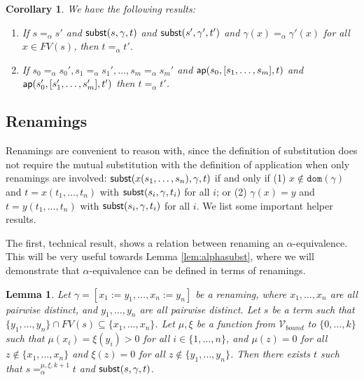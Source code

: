 \documentclass{lmcs}
\theoremstyle{theorem}\newtheorem{theorem}[dummy]{Theorem}
\theoremstyle{theorem}\newtheorem{lemma}[dummy]{Lemma}
\theoremstyle{theorem}\newtheorem{corollary}[dummy]{Corollary}
\theoremstyle{definition}\newtheorem{definition}[dummy]{Definition}
\theoremstyle{definition}\newtheorem{example}[dummy]{Example}
\newcommand{\Vbound}{\mathcal{V}_{\mathit{bound}}}
\newcommand{\FV}{\mathit{FV}}
\newcommand{\domain}{\mathtt{dom}}
\begin{document}
\begin{corollary}\label{cor:substitutionalpha} We have the following results:
\begin{enumerate}
\item If $s =_\alpha s'$ and $\mathsf{subst}(s,\gamma,t)$ and $\mathsf{subst}(s',\gamma',t')$ and
  $\gamma(x) =_\alpha \gamma'(x)$ for all $x \in \FV(s)$, then $t =_\alpha t'$.
\item If $s_0 =_\alpha s_0', s_1 =_\alpha s_1', \dots, s_m =_\alpha s_m'$ and $\mathsf{ap}(s_0, [s_1,\dots,s_m], t)$
  and $\mathsf{ap}(s_0',[s_1',\dots,s_m'],t')$ then $t =_\alpha t'$.
\end{enumerate}
\end{corollary}

\subsection{Renamings}

Renamings are convenient to reason with, since the definition of substitution does not require the
mutual substitution with the definition of application when only renamings are involved:
$\mathsf{subst}(x(s_1,\dots,s_n),\gamma,t)$ if and only if (1) $x \notin \domain(\gamma)$ and $t =
x(t_1,\dots,t_n)$ with $\mathsf{subst}(s_i,\gamma,t_i)$ for all $i$; or (2) $\gamma(x) = y$ and $t =
y(t_1,\dots,t_n)$ with $\mathsf{subst}(s_i,\gamma,t_i)$ for all $i$.
We list some important helper results.

The first, technical result, shows a relation between renaming an $\alpha$-equivalence.  This will
be very useful towards Lemma \ref{lem:alphasubst}, where we will demonstrate that
$\alpha$-equivalence can be defined in terms of renamings.

\begin{lemma}\label{lem:alphasubst:basis}
Let $\gamma = [x_1:=y_1,\dots,x_n:=y_n]$ be a renaming, where $x_1,\dots,x_n$ are all pairwise
distinct, and $y_1,\dots,y_n$ are all pairwise distinct.
Let $s$ be a term such that $\{y_1,\dots,y_n\} \cap \FV(s) \subseteq \{x_1,\dots,x_n\}$.
Let $\mu,\xi$ be a function from $\Vbound$ to $\{0,\dots,k\}$ such that $\mu(x_i) = \xi(y_i) > 0$
for all $i \in \{1,\dots,n\}$, and $\mu(z) = 0$ for all $z \notin \{x_1,\dots,x_n\}$ and $\xi(z) =
0$ for all $z \notin \{y_1,\dots,y_n\}$.
Then there exists $t$ such that $s =_\alpha^{\mu,\xi,k+1} t$ and $\mathsf{subst}(s,\gamma,t)$.
\end{lemma}
\end{document}
